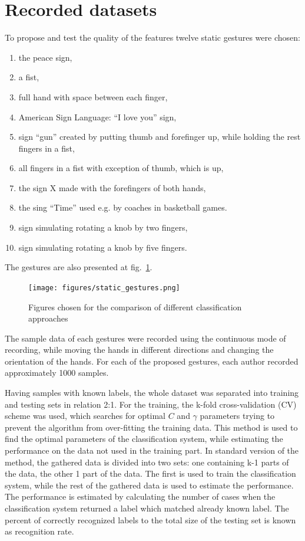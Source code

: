 \section{Recorded datasets}

To propose and test the quality of the features twelve static gestures were chosen:
\begin{enumerate}
\item the peace sign,
\item a fist,
\item full hand with space between each finger,
\item American Sign Language: ``I love you'' sign,
\item sign ``gun'' created by putting thumb and forefinger up, while holding the rest fingers in a fist,
\item all fingers in a fist with exception of thumb, which is up,
\item the sign X made with the forefingers of both hands,
\item the sing ``Time'' used e.g. by coaches in basketball games.
\item sign simulating rotating a knob by two fingers,
\item sign simulating rotating a knob by five fingers.
\end{enumerate} 
The gestures are also presented at fig.~\ref{staticgestures}.

\begin{figure}[htb]
\centering
 \texttt{[image: figures/static\_gestures.png]}
 \caption{Figures chosen for the comparison of different classification approaches}
 \label{staticgestures}
\end{figure}

The sample data of each gestures were recorded using the continuous mode of recording, while moving the hands in different directions and changing the orientation of the hands. 
For each of the proposed gestures, each author recorded approximately 1000 samples.

Having samples with known labels, the whole dataset was separated into training and testing sets in relation 2:1. 
For the training, the k-fold cross-validation (CV) scheme was used, which searches for optimal $C$ and $\gamma$ parameters trying to prevent the algorithm from over-fitting the training data.
This method is used to find the optimal parameters of the classification system, while estimating the performance on the data not used in the training part. 
In standard version of the method, the gathered data is divided into two sets: one containing k-1 parts of the data, the other 1 part of the data. 
The first is used to train the classification system, while the rest of the gathered data is used to estimate the performance. 
The performance is estimated by calculating the number of cases when the classification system returned a label which matched already known label. 
The percent of correctly recognized labels to the total size of the testing set is known as recognition rate.



